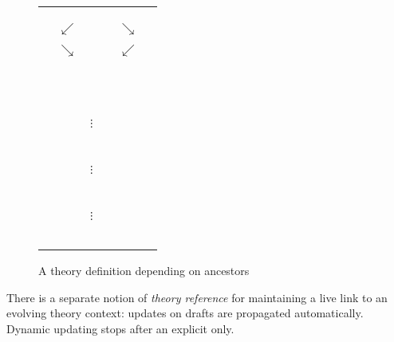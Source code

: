 \begin{isabellebody}
\begin{isamarkuptext}
  \begin{figure}[htb]
  \begin{center}
  \begin{tabular}{rcccl}
        &            & \isa{Pure} \\
        &            & \isa{{\isasymdown}} \\
        &            & \isa{FOL} \\
        & $\swarrow$ &              & $\searrow$ & \\
  \isa{Nat} &    &              &            & \isa{List} \\
        & $\searrow$ &              & $\swarrow$ \\
        &            & \isa{Length} \\
        &            & \multicolumn{3}{l}{~~\hyperlink{keyword.imports}{\mbox{\isa{\isakeyword{imports}}}}} \\
        &            & \multicolumn{3}{l}{~~\hyperlink{keyword.begin}{\mbox{\isa{\isakeyword{begin}}}}} \\
        &            & $\vdots$~~ \\
        &            & \isa{{\isasymbullet}}~~ \\
        &            & $\vdots$~~ \\
        &            & \isa{{\isasymbullet}}~~ \\
        &            & $\vdots$~~ \\
        &            & \multicolumn{3}{l}{~~\hyperlink{command.end}{\mbox{\isa{\isacommand{end}}}}} \\
  \end{tabular}
  \caption{A theory definition depending on ancestors}\label{fig:ex-theory}
  \end{center}
  \end{figure}

  \medskip There is a separate notion of \emph{theory reference} for
  maintaining a live link to an evolving theory context: updates on
  drafts are propagated automatically.  Dynamic updating stops after
  an explicit  only.


\end{isamarkuptext}
\end{isabellebody}
